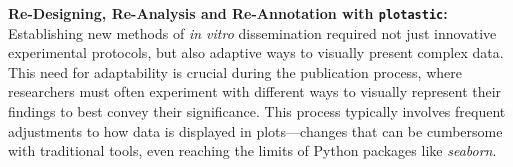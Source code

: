 




\textbf{Re-Designing, Re-Analysis and Re-Annotation with \texttt{plotastic}:}
Establishing new methods of \textit{in vitro} dissemination required not just
innovative experimental protocols, but also adaptive ways to visually present
complex data. This need for adaptability is crucial during the publication
process, where researchers must often experiment with different ways to visually
represent their findings to best convey their significance. This process
typically involves frequent adjustments to how data is displayed in
plots—changes that can be cumbersome with traditional tools, even reaching the
limits of Python packages like \textit{seaborn}.

